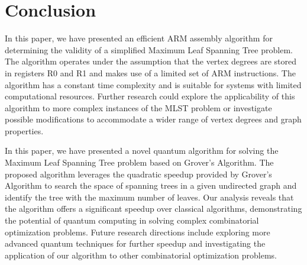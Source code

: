 \section{Conclusion}
In this paper, we have presented an efficient ARM assembly algorithm for determining the validity of a simplified Maximum Leaf Spanning Tree problem. The algorithm operates under the assumption that the vertex degrees are stored in registers R0 and R1 and makes use of a limited set of ARM instructions. The algorithm has a constant time complexity and is suitable for systems with limited computational resources. Further research could explore the applicability of this algorithm to more complex instances of the MLST problem or investigate possible modifications to accommodate a wider range of vertex degrees and graph properties.

In this paper, we have presented a novel quantum algorithm for solving the Maximum Leaf Spanning Tree problem based on Grover's Algorithm. The proposed algorithm leverages the quadratic speedup provided by Grover's Algorithm to search the space of spanning trees in a given undirected graph and identify the tree with the maximum number of leaves. Our analysis reveals that the algorithm offers a significant speedup over classical algorithms, demonstrating the potential of quantum computing in solving complex combinatorial optimization problems. Future research directions include exploring more advanced quantum techniques for further speedup and investigating the application of our algorithm to other combinatorial optimization problems.

